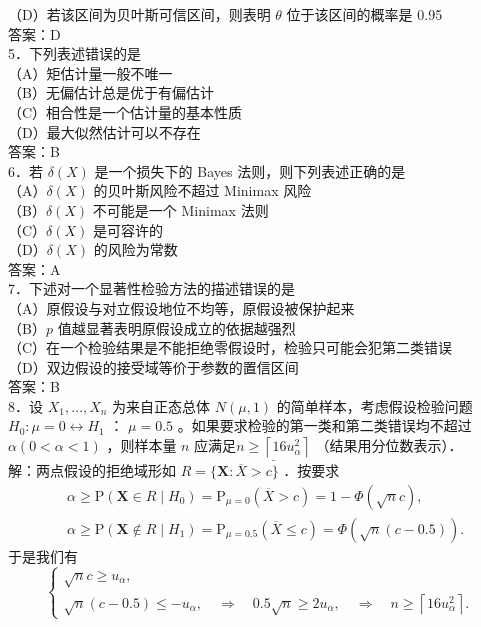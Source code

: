 \documentclass[UTF8,openany]{book}
\begin{document}
	（D）若该区间为贝叶斯可信区间，则表明 $\theta$ 位于该区间的概率是 0.95\\
	答案：D\\
	5．下列表述错误的是\underline{\hspace{2cm}}\\
	（A）矩估计量一般不唯一\\
	（B）无偏估计总是优于有偏估计\\
	（C）相合性是一个估计量的基本性质\\
	（D）最大似然估计可以不存在\\
	答案：B\\
	6．若 $\delta(X)$ 是一个损失下的 Bayes 法则，则下列表述正确的是\underline{\hspace{2cm}}\\
	（A）$\delta(X)$ 的贝叶斯风险不超过 Minimax 风险\\
	（B）$\delta(X)$ 不可能是一个 Minimax 法则\\
	（C）$\delta(X)$ 是可容许的\\
	（D）$\delta(X)$ 的风险为常数\\
	答案：A\\
	7．下述对一个显著性检验方法的描述错误的是\underline{\hspace{2cm}}\\
	（A）原假设与对立假设地位不均等，原假设被保护起来\\
	（B）$p$ 值越显著表明原假设成立的依据越强烈\\
	（C）在一个检验结果是不能拒绝零假设时，检验只可能会犯第二类错误\\
	（D）双边假设的接受域等价于参数的置信区间\\
	答案：B\\
	8．设 $X_1, \ldots, X_n$ 为来自正态总体 $N(\mu, 1)$ 的简单样本，考虑假设检验问题 $H_0: \mu=0 \leftrightarrow H_1$ ： $\mu=0.5$ 。如果要求检验的第一类和第二类错误均不超过 $\alpha(0<\alpha<1)$ ，则样本量 $n$ 应满足$\underline{n \geq\left\lceil 16 u_\alpha^2\right\rceil}$ （结果用分位数表示）．\\
	解：两点假设的拒绝域形如 $R=\{\boldsymbol{X}: \overline{X}>c\}$ ．按要求
	$$
	\begin{aligned}
		& \alpha \geq \mathrm{P}\left(\boldsymbol{X} \in R \mid H_0\right)=\mathrm{P}_{\mu=0}(\overline{X}>c)=1-\Phi(\sqrt{n} c), \\
		& \alpha \geq \mathrm{P}\left(\boldsymbol{X} \notin R \mid H_1\right)=\mathrm{P}_{\mu=0.5}(\overline{X} \leq c)=\Phi(\sqrt{n}(c-0.5)) .
	\end{aligned}
	$$
	于是我们有
	$$
	\left\{\begin{array}{l}
		\sqrt{n} c \geq u_\alpha, \\
		\sqrt{n}(c-0.5) \leq-u_\alpha, \quad \Longrightarrow \quad 0.5 \sqrt{n} \geq 2 u_\alpha, \quad \Longrightarrow \quad n \geq\left\lceil 16 u_\alpha^2\right\rceil .
	\end{array}\right.
	$$
\end{document}
